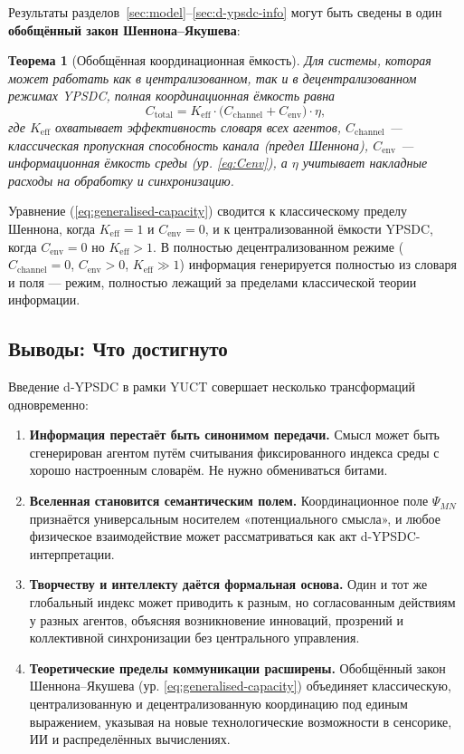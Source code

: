 \documentclass[12pt,a4paper]{article}
\newtheorem{theorem}{Теорема}[section]
\theoremstyle{remark}
\begin{document}
	Результаты разделов~\ref{sec:model}--\ref{sec:d-ypsdc-info} могут быть сведены в один \textbf{обобщённый закон Шеннона–Якушева}:
	
	\begin{theorem}[Обобщённая координационная ёмкость]
		Для системы, которая может работать как в централизованном, так и в децентрализованном режимах YPSDC, полная координационная ёмкость равна
		\begin{equation}
			\boxed{C_{\mathrm{total}} = K_{\mathrm{eff}} \cdot \bigl(
				C_{\mathrm{channel}} + C_{\mathrm{env}} \bigr) \cdot \eta},
			\label{eq:generalised-capacity}
		\end{equation}
		где $K_{\mathrm{eff}}$ охватывает эффективность словаря всех агентов, $C_{\mathrm{channel}}$ — классическая пропускная способность канала (предел Шеннона), $C_{\mathrm{env}}$ — информационная ёмкость среды (ур. \eqref{eq:Cenv}), а $\eta$ учитывает накладные расходы на обработку и синхронизацию.
	\end{theorem}
	
	Уравнение (\ref{eq:generalised-capacity}) сводится к классическому пределу Шеннона, когда $K_{\mathrm{eff}}=1$ и $C_{\mathrm{env}}=0$, и к централизованной ёмкости YPSDC, когда $C_{\mathrm{env}}=0$ но $K_{\mathrm{eff}}>1$. В полностью децентрализованном режиме ($C_{\mathrm{channel}}=0$, $C_{\mathrm{env}}>0$, $K_{\mathrm{eff}}\gg1$) информация генерируется полностью из словаря и поля — режим, полностью лежащий за пределами классической теории информации.
	
	\subsection{Выводы: Что достигнуто}
	\label{subsec:conclusions-dypsdc}
	
	Введение d-YPSDC в рамки YUCT совершает несколько трансформаций одновременно:
	
	\begin{enumerate}[leftmargin=*]
		\item \textbf{Информация перестаёт быть синонимом передачи.}
		Смысл может быть сгенерирован агентом путём считывания фиксированного индекса среды с хорошо настроенным словарём. Не нужно обмениваться битами.
		\item \textbf{Вселенная становится семантическим полем.}
		Координационное поле $\Psi_{MN}$ признаётся универсальным носителем «потенциального смысла», и любое физическое взаимодействие может рассматриваться как акт d-YPSDC-интерпретации.
		\item \textbf{Творчеству и интеллекту даётся формальная основа.}
		Один и тот же глобальный индекс может приводить к разным, но согласованным действиям у разных агентов, объясняя возникновение инноваций, прозрений и коллективной синхронизации без центрального управления.
		\item \textbf{Теоретические пределы коммуникации расширены.}
		Обобщённый закон Шеннона–Якушева (ур. \ref{eq:generalised-capacity}) объединяет классическую, централизованную и децентрализованную координацию под единым выражением, указывая на новые технологические возможности в сенсорике, ИИ и распределённых вычислениях.
	\end{enumerate}
	
\end{document}

